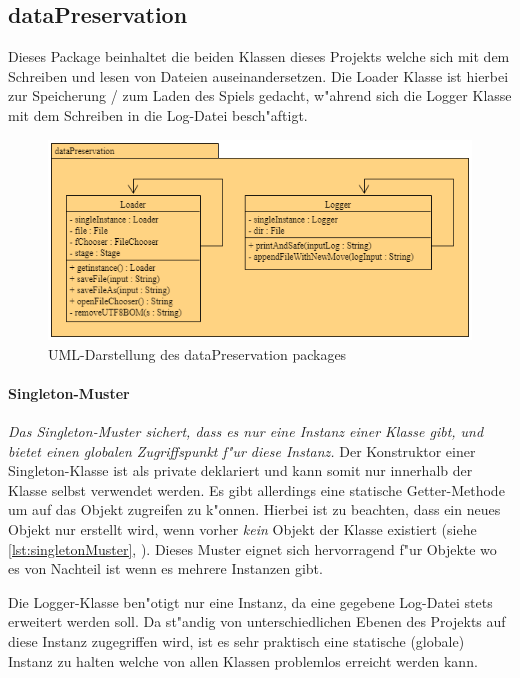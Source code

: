 \subsection{dataPreservation}
\label{ss:dataPreservation}
Dieses Package beinhaltet die beiden Klassen dieses Projekts welche sich mit dem Schreiben und lesen von Dateien auseinandersetzen. Die Loader Klasse ist hierbei zur Speicherung / zum Laden des Spiels gedacht, w"ahrend sich die Logger Klasse mit dem Schreiben in die Log-Datei besch"aftigt. 

\begin{figure}
	\centering
	\includegraphics{pics/dataPreservationPackage}
	\caption{UML-Darstellung des dataPreservation packages}
	\label{fig:dataPreservationPackage}
\end{figure}

\paragraph{Singleton-Muster}
\label{par:singletonMuster}
\emph{Das Singleton-Muster sichert, dass es nur eine Instanz einer Klasse gibt, und bietet einen globalen Zugriffspunkt f"ur diese Instanz.} \cite{Freeman2006}
Der Konstruktor einer Singleton-Klasse ist als private deklariert und kann somit nur innerhalb der Klasse selbst verwendet werden. Es gibt allerdings eine statische Getter-Methode um auf das Objekt zugreifen zu k"onnen. Hierbei ist zu beachten, dass ein neues Objekt nur erstellt wird, wenn vorher \emph{kein} Objekt der Klasse existiert (siehe \ref{lst:singletonMuster}, ). Dieses Muster eignet sich hervorragend f"ur Objekte wo es von Nachteil ist wenn es mehrere Instanzen gibt. 

Die Logger-Klasse ben"otigt nur eine Instanz, da eine gegebene Log-Datei stets erweitert werden soll. Da st"andig von unterschiedlichen Ebenen des Projekts auf diese Instanz zugegriffen wird, ist es sehr praktisch eine statische (globale) Instanz zu halten welche von allen Klassen problemlos erreicht werden kann. 

